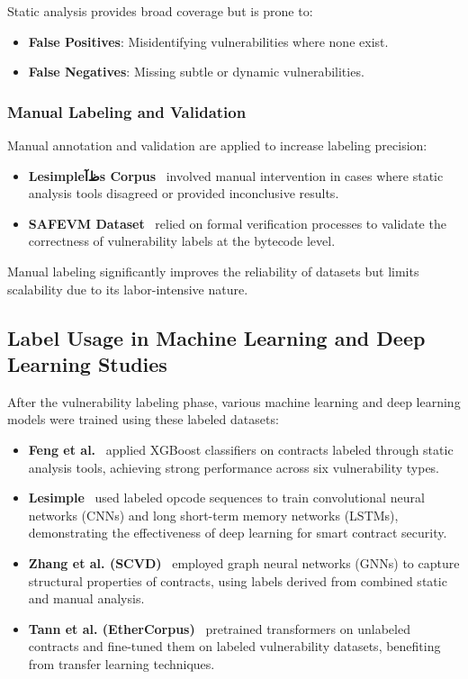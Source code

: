 Static analysis provides broad coverage but is prone to:

\begin{itemize}
    \item \textbf{False Positives}: Misidentifying vulnerabilities where none exist.
    \item \textbf{False Negatives}: Missing subtle or dynamic vulnerabilities.
\end{itemize}

\subsubsection*{Manual Labeling and Validation}

Manual annotation and validation are applied to increase labeling precision:

\begin{itemize}
    \item \textbf{Lesimpleظآs Corpus}~\cite{lesimple2020master} involved manual intervention in cases where static analysis tools disagreed or provided inconclusive results.
    \item \textbf{SAFEVM Dataset}~\cite{albert2019safevm} relied on formal verification processes to validate the correctness of vulnerability labels at the bytecode level.
\end{itemize}

Manual labeling significantly improves the reliability of datasets but limits scalability due to its labor-intensive nature.

\subsection{Label Usage in Machine Learning and Deep Learning Studies}

After the vulnerability labeling phase, various machine learning and deep learning models were trained using these labeled datasets:

\begin{itemize}
    \item \textbf{Feng et al.}~\cite{feng2024interpretable} applied XGBoost classifiers on contracts labeled through static analysis tools, achieving strong performance across six vulnerability types.
    \item \textbf{Lesimple}~\cite{lesimple2020master} used labeled opcode sequences to train convolutional neural networks (CNNs) and long short-term memory networks (LSTMs), demonstrating the effectiveness of deep learning for smart contract security.
    \item \textbf{Zhang et al. (SCVD)}~\cite{zhang2020scvd} employed graph neural networks (GNNs) to capture structural properties of contracts, using labels derived from combined static and manual analysis.
    \item \textbf{Tann et al. (EtherCorpus)}~\cite{tann2020towards} pretrained transformers on unlabeled contracts and fine-tuned them on labeled vulnerability datasets, benefiting from transfer learning techniques.
\end{itemize}

